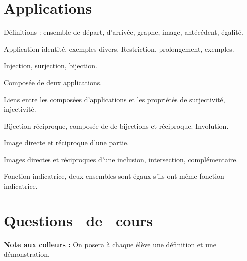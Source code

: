 \documentclass[a4paper,french,bookmarks]{book}
\renewcommand{\questionsdecours}{\section*{\centering\EBGaramond\Large Questions~ de~ cours}}
\begin{document}
    \section*{Applications}
    
    \begin{enumerate}
        \ithand Définitions : ensemble de départ, d'arrivée, graphe, image, antécédent, égalité. 
        
        \ithand Application identité, exemples divers. Restriction, prolongement, exemples.
        
        \ithand Injection, surjection, bijection.
        
        \ithand Composée de deux applications.
        
        \ithand Liens entre les composées d'applications et les propriétés de surjectivité, injectivité.
        
        \ithand Bijection réciproque, composée de de bijections et réciproque. Involution.
        
        \ithand Image directe et réciproque d'une partie.
        
        \ithand Images directes et réciproques d'une inclusion, intersection, complémentaire.
        
        \ithand Fonction indicatrice, deux ensembles sont égaux s'ils ont même fonction indicatrice.
    \end{enumerate}
    
    \questionsdecours
    
    \begin{center}
        \begin{minipage}{0.8\linewidth}
            \begin{tcolorbox}[
                breakable,
                enhanced,
                frame hidden,
                interior style      = {left color=main4!15,right color=main2!12},
                sharp corners       = downhill,
                arc                 = 0 cm,
                boxrule             = 0.5pt,
                drop fuzzy shadow   = black!40!white,
                nobeforeafter,
            ]
                \centering\textbf{\sffamily Note aux colleurs :} On posera à chaque élève une définition et une démonstration.
            \end{tcolorbox}
        \end{minipage}
    \end{center}
\end{document}
